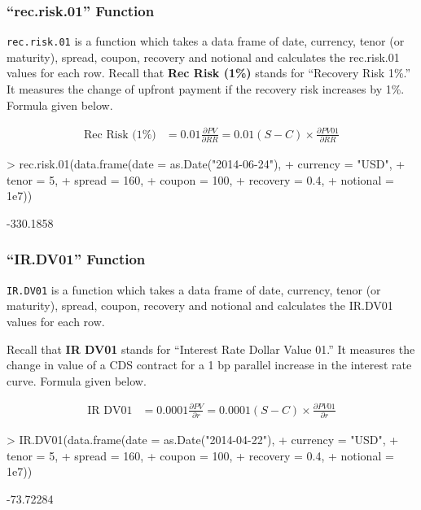 \documentclass{jss}
\begin{document}
\subsubsection{``rec.risk.01'' Function}

\texttt{rec.risk.01} is a function which takes a data frame of date, currency, tenor (or maturity), spread, coupon, recovery and notional and calculates the rec.risk.01 values for each row. Recall that \textbf{Rec Risk (1\%)} stands for ``Recovery Risk 1\%.'' It measures the change of upfront payment if the recovery risk increases by 1\%. Formula given below.

\begin{align*}
  \text{Rec Risk (1\%)} &= 0.01 \frac{\partial PV}{\partial RR} = 0.01 (S - C) \times \frac{\partial PV01}{\partial RR}
\end{align*}

\begin{Schunk}
\begin{Sinput}
> rec.risk.01(data.frame(date     = as.Date("2014-06-24"),
+                        currency = "USD",
+                        tenor    = 5,
+                        spread   = 160,
+                        coupon   = 100,
+                        recovery = 0.4,
+                        notional = 1e7))
\end{Sinput}
\begin{Soutput}
[1] -330.1858
\end{Soutput}
\end{Schunk}

\subsubsection{``IR.DV01'' Function}

\texttt{IR.DV01} is a function which takes a data frame of date, currency, tenor (or maturity), spread, coupon, recovery and notional and calculates the IR.DV01 values for each row.

Recall that \textbf{IR DV01} stands for ``Interest Rate Dollar Value 01.'' It measures the change in value of a CDS contract for a 1 bp parallel increase in the interest rate curve. Formula given below.

\begin{align*}
  \text{IR DV01} &= 0.0001 \frac{\partial PV}{\partial r} = 0.0001 (S - C) \times \frac{\partial PV01}{\partial r}
\end{align*}


\begin{Schunk}
\begin{Sinput}
> IR.DV01(data.frame(date     = as.Date("2014-04-22"),
+                    currency = "USD",
+                    tenor    = 5,
+                    spread   = 160,
+                    coupon   = 100,
+                    recovery = 0.4,
+                    notional = 1e7))
\end{Sinput}
\begin{Soutput}
[1] -73.72284
\end{Soutput}
\end{Schunk}
\end{document}
